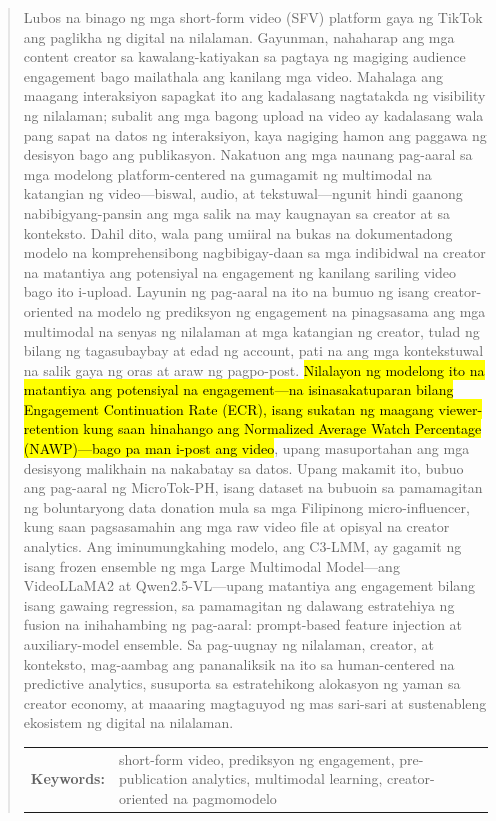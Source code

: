 \begin{abstract}
Lubos na binago ng mga short-form video (SFV) platform gaya ng TikTok ang paglikha ng digital na nilalaman. Gayunman, nahaharap ang mga content creator sa kawalang-katiyakan sa pagtaya ng magiging audience engagement bago mailathala ang kanilang mga video. Mahalaga ang maagang interaksiyon sapagkat ito ang kadalasang nagtatakda ng visibility ng nilalaman; subalit ang mga bagong upload na video ay kadalasang wala pang sapat na datos ng interaksiyon, kaya nagiging hamon ang paggawa ng desisyon bago ang publikasyon. Nakatuon ang mga naunang pag-aaral sa mga modelong platform-centered na gumagamit ng multimodal na katangian ng video—biswal, audio, at tekstuwal—ngunit hindi gaanong nabibigyang-pansin ang mga salik na may kaugnayan sa creator at sa konteksto. Dahil dito, wala pang umiiral na bukas na dokumentadong modelo na komprehensibong nagbibigay-daan sa mga indibidwal na creator na matantiya ang potensiyal na engagement ng kanilang sariling video bago ito i-upload. Layunin ng pag-aaral na ito na bumuo ng isang creator-oriented na modelo ng prediksyon ng engagement na pinagsasama ang mga multimodal na senyas ng nilalaman at mga katangian ng creator, tulad ng bilang ng tagasubaybay at edad ng account, pati na ang mga kontekstuwal na salik gaya ng oras at araw ng pagpo-post. \hl{Nilalayon ng modelong ito na matantiya ang potensiyal na engagement—na isinasakatuparan bilang Engagement Continuation Rate (ECR), isang sukatan ng maagang viewer-retention kung saan hinahango ang Normalized Average Watch Percentage (NAWP)—bago pa man i-post ang video}, upang masuportahan ang mga desisyong malikhain na nakabatay sa datos. Upang makamit ito, bubuo ang pag-aaral ng MicroTok-PH, isang dataset na bubuoin sa pamamagitan ng boluntaryong data donation mula sa mga Filipinong micro-influencer, kung saan pagsasamahin ang mga raw video file at opisyal na creator analytics. Ang iminumungkahing modelo, ang C3-LMM, ay gagamit ng isang frozen ensemble ng mga Large Multimodal Model—ang VideoLLaMA2 at Qwen2.5-VL—upang matantiya ang engagement bilang isang gawaing regression, sa pamamagitan ng dalawang estratehiya ng fusion na inihahambing ng pag-aaral: prompt-based feature injection at auxiliary-model ensemble. Sa pag-uugnay ng nilalaman, creator, at konteksto, mag-aambag ang pananaliksik na ito sa human-centered na predictive analytics, susuporta sa estratehikong alokasyon ng yaman sa creator economy, at maaaring magtaguyod ng mas sari-sari at sustenableng ekosistem ng digital na nilalaman.


\begin{flushleft}
\begin{tabular}{lp{4.25in}}
\hspace{-0.5em}\textbf{Keywords:}\hspace{0.25em} & short-form video, prediksyon ng engagement, pre-publication analytics, multimodal learning, creator-oriented na pagmomodelo
\end{tabular}
\end{flushleft}
\end{abstract}
